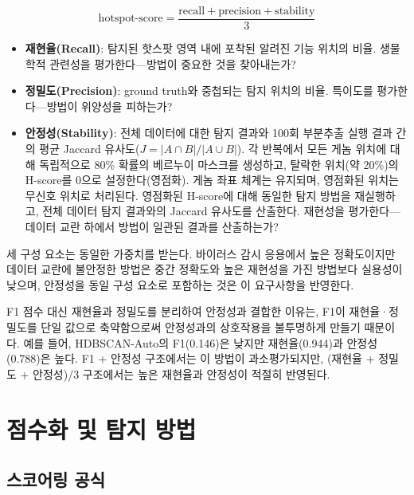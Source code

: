 \begin{equation}
\text{hotspot-score} = \frac{\text{recall} + \text{precision} + \text{stability}}{3}
\label{eq:hotspot_score}
\end{equation}

\begin{itemize}
\item \textbf{재현율(Recall)}: 탐지된 핫스팟 영역 내에 포착된 알려진 기능 위치의 비율. 생물학적 관련성을 평가한다---방법이 중요한 것을 찾아내는가?
\item \textbf{정밀도(Precision)}: ground truth와 중첩되는 탐지 위치의 비율. 특이도를 평가한다---방법이 위양성을 피하는가?
\item \textbf{안정성(Stability)}: 전체 데이터에 대한 탐지 결과와 100회 부분추출 실행 결과 간의 평균 Jaccard 유사도($J = |A \cap B| / |A \cup B|$). 각 반복에서 모든 게놈 위치에 대해 독립적으로 80\% 확률의 베르누이 마스크를 생성하고, 탈락한 위치(약 20\%)의 H-score를 0으로 설정한다(영점화). 게놈 좌표 체계는 유지되며, 영점화된 위치는 무신호 위치로 처리된다. 영점화된 H-score에 대해 동일한 탐지 방법을 재실행하고, 전체 데이터 탐지 결과와의 Jaccard 유사도를 산출한다. 재현성을 평가한다---데이터 교란 하에서 방법이 일관된 결과를 산출하는가?
\end{itemize}

세 구성 요소는 동일한 가중치를 받는다. 바이러스 감시 응용에서 높은 정확도이지만 데이터 교란에 불안정한 방법은 중간 정확도와 높은 재현성을 가진 방법보다 실용성이 낮으며, 안정성을 동일 구성 요소로 포함하는 것은 이 요구사항을 반영한다.

\noindent F1 점수 대신 재현율과 정밀도를 분리하여 안정성과 결합한 이유는, F1이 재현율·정밀도를 단일 값으로 축약함으로써 안정성과의 상호작용을 불투명하게 만들기 때문이다.
예를 들어, HDBSCAN-Auto의 F1(0.146)은 낮지만 재현율(0.944)과 안정성(0.788)은 높다.
F1 + 안정성 구조에서는 이 방법이 과소평가되지만, (재현율 + 정밀도 + 안정성)/3 구조에서는 높은 재현율과 안정성이 적절히 반영된다.

\section{점수화 및 탐지 방법}
\label{sec:scoring_detection_kr}

\subsection{스코어링 공식}
\label{subsec:9pathogen_scoring}

